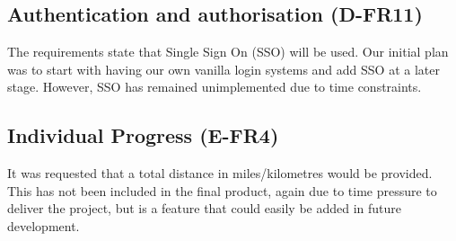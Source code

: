 \subsection{Authentication and authorisation (D-FR11)}
The requirements state that Single Sign On (SSO) will be used. Our initial plan was to start with having our own vanilla login systems and add SSO at a later stage. However, SSO has remained unimplemented due to time constraints. 

\subsection{Individual Progress (E-FR4)}
It was requested that a total distance in miles/kilometres would be provided. This has not been included in the final product, again due to time pressure to deliver the project, but is a feature that could easily be added in future development.

